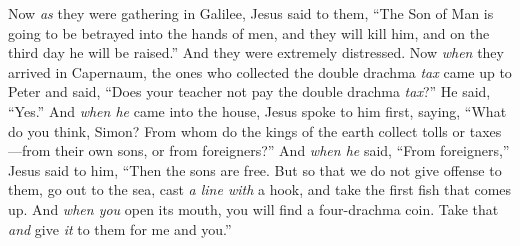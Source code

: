 \begin{biblechapter}
 Now \textit{as} they were gathering in Galilee, Jesus said to them, “The Son of Man is going to be betrayed into the hands of men,
\verse and they will kill him, and on the third day he will be raised.” And they were extremely distressed.
 Now \textit{when} they arrived in Capernaum, the ones who collected the double drachma \textit{tax} came up to Peter and said, “Does your teacher not pay the double drachma \textit{tax}?”
\verse He said, “Yes.” And \textit{when he} came into the house, Jesus spoke to him first, saying, “What do you think, Simon? From whom do the kings of the earth collect tolls or taxes—from their own sons, or from foreigners?”
\verse And \textit{when he} said, “From foreigners,” Jesus said to him, “Then the sons are free.
\verse But so that we do not give offense to them, go out to the sea, cast \textit{a line with} a hook, and take the first fish that comes up. And \textit{when you} open its mouth, you will find a four-drachma coin. Take that \textit{and} give \textit{it} to them for me and you.”
\end{biblechapter}

